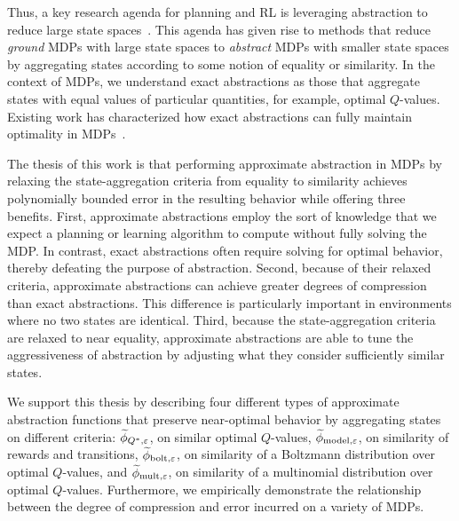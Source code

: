 Thus, a key research agenda for planning and \ac{RL} is leveraging abstraction to reduce large state spaces~\cite{andre2002state,jong2005state,dietterich2000hierarchical,Bean2011}. This agenda has given rise to methods that reduce \textit{ground} \acp{MDP} with large state spaces to \textit{abstract} MDPs with smaller state spaces by aggregating states according to some notion of equality or similarity. In the context of \acp{MDP}, we understand exact abstractions as those that aggregate states with equal values of particular quantities, for example, optimal $Q$-values. Existing work has characterized how exact abstractions can fully maintain optimality in \acp{MDP}~\cite{li2006towards,dean1997modelmin}. 

\renewcommand*{\thefootnote}{\arabic{footnote}}

The thesis of this work is that performing approximate abstraction in \acp{MDP} by relaxing the state-aggregation criteria from equality to similarity achieves polynomially bounded error in the resulting behavior while offering three benefits. First, approximate abstractions employ the sort of knowledge that we expect a planning or learning algorithm to compute without fully solving the \ac{MDP}. In contrast, exact abstractions often require solving for optimal behavior, thereby defeating the purpose of abstraction. Second, because of their relaxed criteria, approximate abstractions can achieve greater degrees of compression than exact abstractions. This difference is particularly important in environments where no two states are identical. Third, because the state-aggregation criteria are relaxed to near equality, approximate abstractions are able to tune the aggressiveness of abstraction by adjusting what they consider sufficiently similar states. 

We support this thesis by describing four different types of approximate abstraction functions that preserve near-optimal behavior by aggregating states on different criteria: $\widetilde \phi_{Q^*,\varepsilon}$, on similar optimal $Q$-values, $\widetilde \phi_{\text{model},\varepsilon}$, on similarity of rewards and transitions, $\widetilde \phi_{\text{bolt},\varepsilon}$, on similarity of a Boltzmann distribution over optimal $Q$-values, and $\widetilde \phi_{\text{mult},\varepsilon}$, on similarity of a multinomial distribution over optimal $Q$-values. Furthermore, we empirically demonstrate the relationship between the degree of compression and error incurred on a variety of \acp{MDP}.

